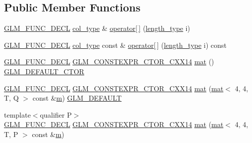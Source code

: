 \subsection*{Public Member Functions}
\begin{DoxyCompactItemize}
\item 
\mbox{\hyperlink{setup_8hpp_ab2d052de21a70539923e9bcbf6e83a51}{G\+L\+M\+\_\+\+F\+U\+N\+C\+\_\+\+D\+E\+CL}} \mbox{\hyperlink{structglm_1_1mat_3_014_00_014_00_01_t_00_01_q_01_4_aad430dc291d0156d573c434be7fdecc1}{col\+\_\+type}} \& \mbox{\hyperlink{structglm_1_1mat_3_014_00_014_00_01_t_00_01_q_01_4_a45140ed8c7f6d53ed8fa2ddc04ac1bb2}{operator\mbox{[}$\,$\mbox{]}}} (\mbox{\hyperlink{structglm_1_1mat_3_014_00_014_00_01_t_00_01_q_01_4_ae06c2957874bbff5701b304668b5cb01}{length\+\_\+type}} i)
\item 
\mbox{\hyperlink{setup_8hpp_ab2d052de21a70539923e9bcbf6e83a51}{G\+L\+M\+\_\+\+F\+U\+N\+C\+\_\+\+D\+E\+CL}} \mbox{\hyperlink{structglm_1_1mat_3_014_00_014_00_01_t_00_01_q_01_4_aad430dc291d0156d573c434be7fdecc1}{col\+\_\+type}} const  \& \mbox{\hyperlink{structglm_1_1mat_3_014_00_014_00_01_t_00_01_q_01_4_a03fe2789c5b3555f79883dae649167f4}{operator\mbox{[}$\,$\mbox{]}}} (\mbox{\hyperlink{structglm_1_1mat_3_014_00_014_00_01_t_00_01_q_01_4_ae06c2957874bbff5701b304668b5cb01}{length\+\_\+type}} i) const
\item 
\mbox{\hyperlink{setup_8hpp_ab2d052de21a70539923e9bcbf6e83a51}{G\+L\+M\+\_\+\+F\+U\+N\+C\+\_\+\+D\+E\+CL}} \mbox{\hyperlink{setup_8hpp_a0900f9145e68bf6061b6f5e7be3fa751}{G\+L\+M\+\_\+\+C\+O\+N\+S\+T\+E\+X\+P\+R\+\_\+\+C\+T\+O\+R\+\_\+\+C\+X\+X14}} \mbox{\hyperlink{structglm_1_1mat_3_014_00_014_00_01_t_00_01_q_01_4_ad5a56ae437785b4a19e5423d00e34f80}{mat}} () \mbox{\hyperlink{setup_8hpp_afb97a4e995bc004c0cbbfa22125b80ba}{G\+L\+M\+\_\+\+D\+E\+F\+A\+U\+L\+T\+\_\+\+C\+T\+OR}}
\item 
\mbox{\hyperlink{setup_8hpp_ab2d052de21a70539923e9bcbf6e83a51}{G\+L\+M\+\_\+\+F\+U\+N\+C\+\_\+\+D\+E\+CL}} \mbox{\hyperlink{setup_8hpp_a0900f9145e68bf6061b6f5e7be3fa751}{G\+L\+M\+\_\+\+C\+O\+N\+S\+T\+E\+X\+P\+R\+\_\+\+C\+T\+O\+R\+\_\+\+C\+X\+X14}} \mbox{\hyperlink{structglm_1_1mat_3_014_00_014_00_01_t_00_01_q_01_4_a3df7423fcb4eb04f5ad5e24ce5a8d7ca}{mat}} (\mbox{\hyperlink{structglm_1_1mat}{mat}}$<$ 4, 4, T, Q $>$ const \&\mbox{\hyperlink{_s_d_l__opengl__glext_8h_af593500c283bf1a787a6f947f503a5c2}{m}}) \mbox{\hyperlink{setup_8hpp_aefce7051c376a64ba89fa93a9f63bc2c}{G\+L\+M\+\_\+\+D\+E\+F\+A\+U\+LT}}
\item 
{\footnotesize template$<$qualifier P$>$ }\\\mbox{\hyperlink{setup_8hpp_ab2d052de21a70539923e9bcbf6e83a51}{G\+L\+M\+\_\+\+F\+U\+N\+C\+\_\+\+D\+E\+CL}} \mbox{\hyperlink{setup_8hpp_a0900f9145e68bf6061b6f5e7be3fa751}{G\+L\+M\+\_\+\+C\+O\+N\+S\+T\+E\+X\+P\+R\+\_\+\+C\+T\+O\+R\+\_\+\+C\+X\+X14}} \mbox{\hyperlink{structglm_1_1mat_3_014_00_014_00_01_t_00_01_q_01_4_a9bb105cf95abdde89031315e39bcbe9a}{mat}} (\mbox{\hyperlink{structglm_1_1mat}{mat}}$<$ 4, 4, T, P $>$ const \&\mbox{\hyperlink{_s_d_l__opengl__glext_8h_af593500c283bf1a787a6f947f503a5c2}{m}})

\end{DoxyCompactItemize}
